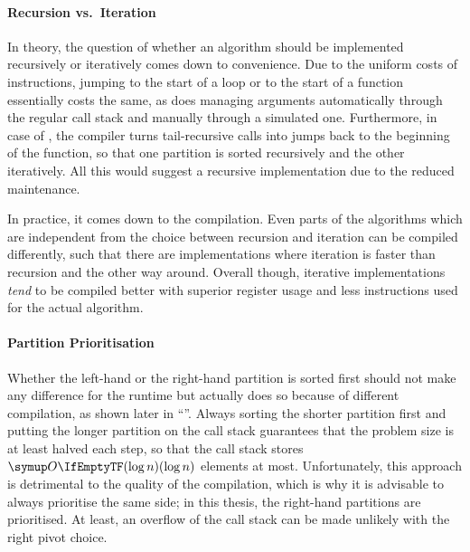\paragraph{Recursion vs.\ Iteration}
In theory, the question of whether an algorithm should be implemented recursively or iteratively comes down to convenience.
Due to the uniform costs of instructions, jumping to the start of a loop or to the start of a function essentially costs the same, as does managing arguments automatically through the regular call stack and manually through a simulated one.
Furthermore, in case of \QS{}, the compiler turns tail-recursive calls into jumps back to the beginning of the function, so that one partition is sorted recursively and the other iteratively.
All this would suggest a recursive implementation due to the reduced maintenance.

In practice, it comes down to the compilation.
Even parts of the algorithms which are independent from the choice between recursion and iteration can be compiled differently, such that there are implementations where iteration is faster than recursion and the other way around.
Overall though, iterative implementations \emph{tend} to be compiled better with superior register usage and less instructions used for the actual \QS{} algorithm.


\paragraph{Partition Prioritisation}
Whether the left-hand or the right-hand partition is sorted first should not make any difference for the runtime but actually does so because of different compilation, as shown later in \enquote{}.
Always sorting the shorter partition first and putting the longer partition on the call stack guarantees that the problem size is at least halved each step, so that the call stack stores \(\bigoh{\log n}\) elements at most.
Unfortunately, this approach is detrimental to the quality of the compilation, which is why it is advisable to always prioritise the same side;
in this thesis, the right-hand partitions are prioritised.
At least, an overflow of the call stack can be made unlikely with the right pivot choice.


